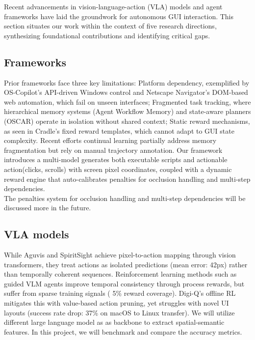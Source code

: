 \documentclass[11pt,letterpaper]{article}
\begin{document}
Recent advancements in vision-language-action (VLA) models and agent frameworks have laid the groundwork for autonomous GUI interaction. This section situates our work within the context of five research directions, synthesizing foundational contributions and identifying critical gaps.

\subsection{Frameworks}
Prior frameworks face three key limitations: Platform dependency, exemplified by OS-Copilot's API-driven Windows control and Netscape Navigator's DOM-based web automation, which fail on unseen interfaces; Fragmented task tracking, where hierarchical memory systems (Agent Workflow Memory) and state-aware planners (OSCAR) operate in isolation without shared context; Static reward mechanisms, as seen in Cradle's fixed reward templates, which cannot adapt to GUI state complexity. Recent efforts continual learning partially address memory fragmentation but rely on manual trajectory annotation. Our framework introduces a multi-model generates both executable scripts and actionable action(clicks, scrolls) with screen pixel coordinates, coupled with a dynamic reward engine that auto-calibrates penalties for occlusion handling and multi-step dependencies. \\
The penalties system for occlusion handling and multi-step dependencies will be discussed more in the future.

\subsection{VLA models}
While Aguvis and SpiritSight achieve pixel-to-action mapping through vision transformers, they treat actions as isolated predictions (mean error: 42px) rather than temporally coherent sequences. Reinforcement learning methods such as guided VLM agents improve temporal consistency through process rewards, but suffer from sparse training signals ( 5\% reward coverage). Digi-Q's offline RL mitigates this with value-based action pruning, yet struggles with novel UI layouts (success rate drop: 37\% on macOS to Linux transfer). We will utilize different large language model as as backbone to extract spatial-semantic features. In this project, we will benchmark and compare the accuracy metrics.
\end{document}
